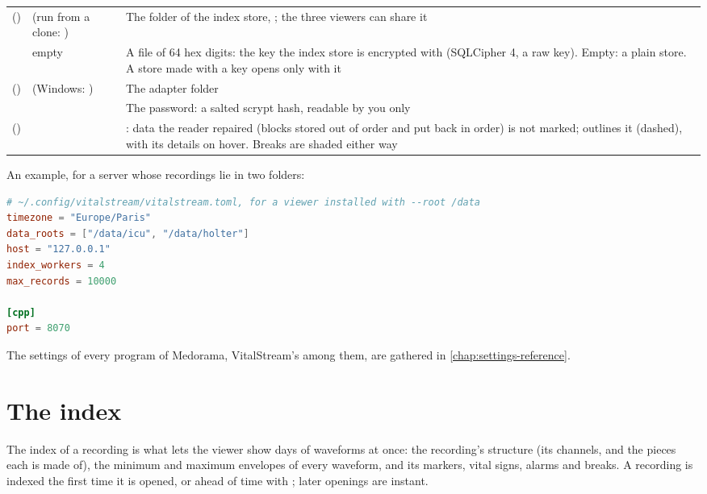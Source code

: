 \begin{xltabular}{\linewidth}{@{}P{3.4cm}P{3.0cm}L@{}}
 () &  (run from a
  clone: ) & The folder of the index store,
  ; the three viewers can share it \\
 & empty & A file of 64 hex digits: the key the index store is encrypted
  with (SQLCipher 4, a raw key). Empty: a plain store. A store made with a key opens only with
  it \\
 () & 
  (Windows: ) & The adapter
  folder \\
 &  & The password: a salted
  scrypt hash, readable by you only \\
 () &  & : data the reader repaired
  (blocks stored out of order and put back in order) is not marked;  outlines it
  (dashed), with its details on hover. Breaks are shaded either way \\
\end{xltabular}

An example, for a server whose recordings lie in two folders:

\begin{lstlisting}[language=TOML,style=example]
# ~/.config/vitalstream/vitalstream.toml, for a viewer installed with --root /data
timezone = "Europe/Paris"
data_roots = ["/data/icu", "/data/holter"]
host = "127.0.0.1"
index_workers = 4
max_records = 10000

[cpp]
port = 8070
\end{lstlisting}

The settings of every program of Medorama, VitalStream's among them, are gathered in
\cref{chap:settings-reference}.

\section{The index}
\label{sec:vitalstream-index}

The index of a recording is what lets the viewer show days of waveforms at once: the
recording's structure (its channels, and the pieces each is made of), the minimum and maximum
envelopes of every waveform, and its markers, vital signs, alarms and breaks. A recording is
indexed the first time it is opened, or ahead of time with ; later openings
are instant.

